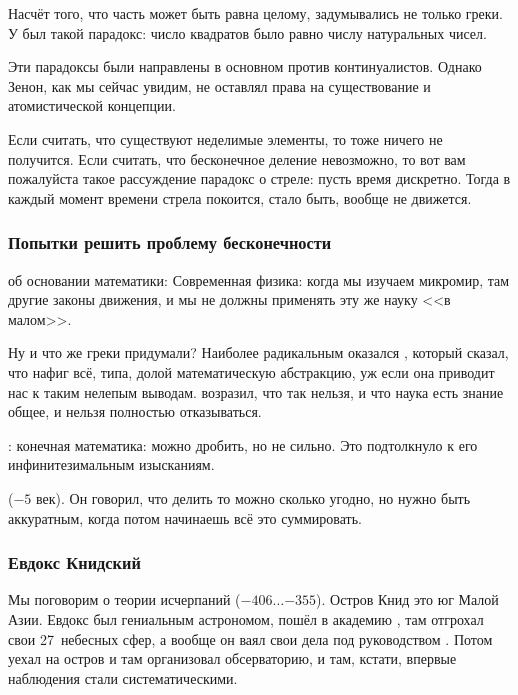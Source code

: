 \documentclass[a4paper,oneside,fleqn,10pt]{article}
\newcommand{\pe}[2]{${#1}\ldots{#2}$}
\begin{document}
Насчёт того, что часть может быть равна целому, задумывались не только
греки. У  был такой парадокс: число квадратов
было равно числу натуральных чисел.

Эти парадоксы были направлены в основном против континуалистов. Однако
Зенон, как мы сейчас увидим, не оставлял права на существование и
атомистической концепции.

Если считать, что существуют неделимые элементы, то тоже ничего не
получится. Если считать, что бесконечное деление невозможно, то вот
вам пожалуйста такое рассуждение парадокс о стреле: пусть время
дискретно. Тогда в каждый момент времени стрела покоится, стало быть,
вообще не движется.

\subsubsection{Попытки решить проблему бесконечности}

 об основании математики:
Современная физика: когда мы изучаем микромир, там другие законы
движения, и мы не должны применять эту же науку <<в малом>>.

Ну и что же греки придумали?  Наиболее радикальным оказался
, который сказал, что нафиг всё, типа, долой
математическую абстракцию, уж если она приводит нас к таким нелепым
выводам.   возразил, что так нельзя, и что наука есть
знание общее, и нельзя полностью отказываться.

: конечная математика: можно дробить, но не сильно. Это
подтолкнуло  к его инфинитезимальным
изысканиям.

 ($-5$ век). Он говорил, что делить то можно сколько
угодно, но нужно быть аккуратным, когда потом начинаешь всё это
суммировать.

\subsubsection{Евдокс Книдский}

Мы поговорим о теории исчерпаний  (\pe{-406}{-355}).  Остров Книд это юг Малой Азии.  Евдокс
был гениальным астрономом, пошёл в академию ,
там отгрохал свои 27~небесных сфер, а вообще он ваял свои дела под
руководством .  Потом
уехал на остров и там организовал обсерваторию, и там, кстати, впервые
наблюдения стали систематическими.
\end{document}
